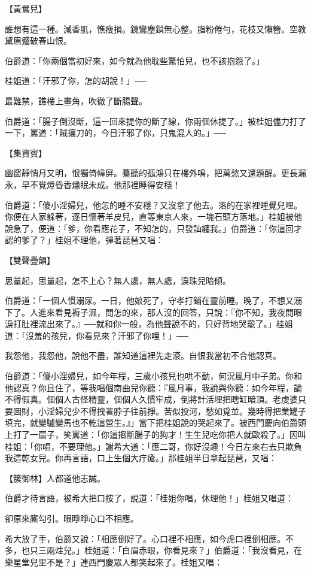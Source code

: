 【黃鶯兒】

誰想有這一種。減香肌，憔瘦損。鏡鸞塵鎖無心整。脂粉倦勻，花枝又懶簪。空教黛眉蹙破春山恨。

伯爵道：「你兩個當初好來，如今就為他耽些驚怕兒，也不該抱怨了。」

桂姐道：「汗邪了你，怎的胡說！」──

最難禁，譙樓上畫角，吹徹了斷腸聲。

伯爵道：「腸子倒沒斷，這一回來提你的斷了線，你兩個休提了。」被桂姐儘力打了一下，罵道：「賊攘刀的，今日汗邪了你，只鬼混人的。」──

【集資賓】

幽窗靜悄月又明，恨獨倚幃屏。驀聽的孤鴻只在樓外鳴，把萬愁又還題醒。更長漏永，早不覺燈昏香燼眠未成。他那裡睡得安穩！

伯爵道：「傻小淫婦兒，他怎的睡不安穩？又沒拿了他去。落的在家裡睡覺兒哩。你便在人家躲著，逐日懷著羊皮兒，直等東京人來，一塊石頭方落地。」桂姐被他說急了，便道：「爹，你看應花子，不知怎的，只發訕纏我。」伯爵道：「你這回才認的爹了？」桂姐不理他，彈著琵琶又唱：

【雙聲疊韻】

思量起，思量起，怎不上心？無人處，無人處，淚珠兒暗傾。

伯爵道：「一個人慣溺尿。一日，他娘死了，守孝打鋪在靈前睡。晚了，不想又溺下了。人進來看見褥子濕，問怎的來，那人沒的回答，只說：『你不知，我夜間眼淚打肚裡流出來了。』──就和你一般，為他聲說不的，只好背地哭罷了。」桂姐道：「沒羞的孩兒，你看見來？汗邪了你哩！」──

我怨他，我怨他，說他不盡，誰知道這裡先走滾。自恨我當初不合他認真。

伯爵道：「傻小淫婦兒，如今年程，三歲小孩兒也哄不動，何況風月中子弟。你和他認真？你且住了，等我唱個南曲兒你聽：『風月事，我說與你聽：如今年程，論不得假真。個個人古怪精靈，個個人久慣牢成，倒將計活埋把瞎缸暗頂。老虔婆只要圖財，小淫婦兒少不得拽著脖子往前掙。苦似投河，愁如覓並。幾時得把業罐子填完，就變驢變馬也不乾這營生。』」當下把桂姐說的哭起來了。被西門慶向伯爵頭上打了一扇子，笑罵道：「你這搊斷腸子的狗才！生生兒吃你把人就歐殺了。」因叫桂姐：「你唱，不要理他。」謝希大道：「應二哥，你好沒趣！今日左來右去只欺負我這乾女兒。你再言語，口上生個大疔瘡。」那桂姐半日拿起琵琶，又唱：

【簇御林】人都道他志誠。

伯爵才待言語，被希大把口按了，說道：「桂姐你唱，休理他！」桂姐又唱道：

卻原來廝勾引。眼睜睜心口不相應。

希大放了手，伯爵又說：「相應倒好了。心口裡不相應，如今虎口裡倒相應。不多，也只三兩炷兒。」桂姐道：「白眉赤眼，你看見來？」伯爵道：「我沒看見，在樂星堂兒里不是？」連西門慶眾人都笑起來了。桂姐又唱：

